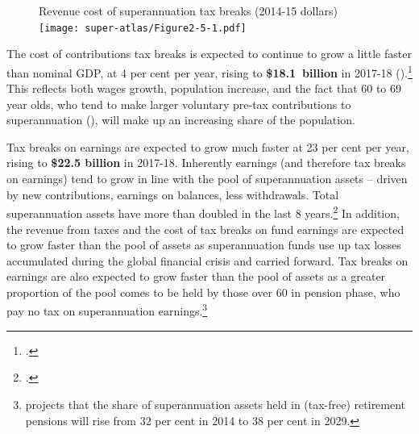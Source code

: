 \begin{figure}
%
{Revenue cost of superannuation tax breaks (2014-15 dollars)}\label{fig:SUPER-2-5}
\texttt{[image: super-atlas/Figure2-5-1.pdf]}

\end{figure}

The cost of contributions tax breaks is expected to continue to grow a little faster than nominal GDP, at 4 per cent per year, rising to \textbf{\$18.1~billion} in 2017-18 ().\footcite[][4--14]{Treasury2015BudgetPapers201516}  
This reflects both wages growth, population increase, and the fact that 60 to 69 year olds, who tend to make larger voluntary pre-tax contributions to superannuation (), will make up an increasing share of the population. 

Tax breaks on earnings are expected to grow much faster at 23 per cent per year, rising to \textbf{\$22.5 billion} in 2017-18. Inherently earnings (and therefore tax breaks on earnings) tend to grow in line with the pool of superannuation assets – driven by new contributions, earnings on balances, less withdrawals. Total superannuation assets have more than doubled in the last 8 years.\footcite[Table~7]{APRA2014}  
In addition, the revenue from taxes and the cost of tax breaks on fund earnings are expected to grow faster than the pool of assets as superannuation funds use up tax losses accumulated during the global financial crisis and carried forward. Tax breaks on earnings are also expected to grow faster than the pool of assets as a greater proportion of the pool comes to be held by those over 60 in pension phase, who pay no tax on superannuation earnings.\footnote{\textcite[][23]{RiceWarner2015SubmissionTaxWhitePaper} projects that the share of superannuation assets held in (tax-free) retirement pensions will rise from 32 per cent in 2014 to 38 per cent in 2029.}  


